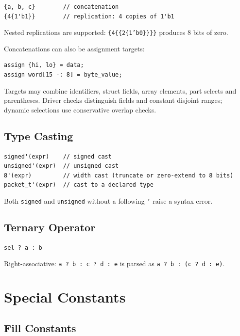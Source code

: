 \documentclass[lang=en,11pt]{elegantbook}
\newcommand{\code}[1]{\texttt{#1}}
\begin{document}
\begin{lstlisting}[language=Slip]
{a, b, c}        // concatenation
{4{1'b1}}        // replication: 4 copies of 1'b1
\end{lstlisting}

Nested replications are supported: \code{\{4\{\{2\{1'b0\}\}\}\}} produces 8 bits of zero.

Concatenations can also be assignment targets:

\begin{lstlisting}[language=Slip]
assign {hi, lo} = data;
assign word[15 -: 8] = byte_value;
\end{lstlisting}

Targets may combine identifiers, struct fields, array elements, part selects and
parentheses. Driver checks distinguish fields and constant disjoint ranges;
dynamic selections use conservative overlap checks.

\section{Type Casting}

\begin{lstlisting}[language=Slip]
signed'(expr)    // signed cast
unsigned'(expr)  // unsigned cast
8'(expr)         // width cast (truncate or zero-extend to 8 bits)
packet_t'(expr)  // cast to a declared type
\end{lstlisting}

Both \code{signed} and \code{unsigned} without a following \code{'} raise a syntax error.

\section{Ternary Operator}

\begin{lstlisting}[language=Slip]
sel ? a : b
\end{lstlisting}

Right-associative: \code{a ? b : c ? d : e} is parsed as \code{a ? b : (c ? d : e)}.

\chapter{Special Constants}

\section{Fill Constants}
\end{document}
